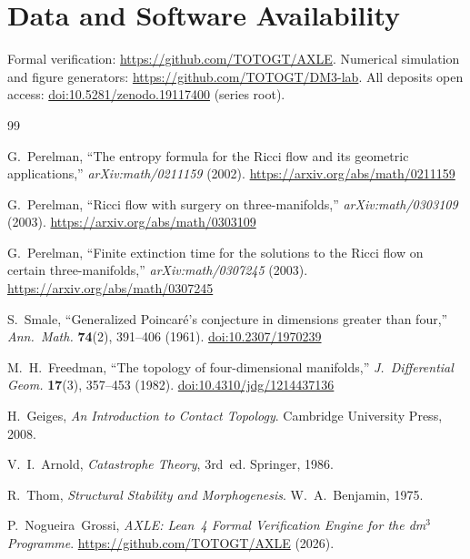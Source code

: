 \documentclass[12pt,a4paper]{article}
\begin{document}
\section*{Data and Software Availability}

Formal verification: \url{https://github.com/TOTOGT/AXLE}.
Numerical simulation and figure generators:
\url{https://github.com/TOTOGT/DM3-lab}.
All deposits open access:
\href{https://doi.org/10.5281/zenodo.19117400}%
{doi:10.5281/zenodo.19117400} (series root).

\begin{thebibliography}{99}
\sloppy

G.~Perelman,
``The entropy formula for the Ricci flow and its geometric applications,''
\textit{arXiv:math/0211159} (2002).
\url{https://arxiv.org/abs/math/0211159}

G.~Perelman,
``Ricci flow with surgery on three-manifolds,''
\textit{arXiv:math/0303109} (2003).
\url{https://arxiv.org/abs/math/0303109}

G.~Perelman,
``Finite extinction time for the solutions to the Ricci flow on
certain three-manifolds,''
\textit{arXiv:math/0307245} (2003).
\url{https://arxiv.org/abs/math/0307245}

S.~Smale,
``Generalized Poincar\'e's conjecture in dimensions greater than four,''
\textit{Ann.\ Math.} \textbf{74}(2), 391--406 (1961).
\href{https://doi.org/10.2307/1970239}{doi:10.2307/1970239}

M.~H.~Freedman,
``The topology of four-dimensional manifolds,''
\textit{J.\ Differential Geom.} \textbf{17}(3), 357--453 (1982).
\href{https://doi.org/10.4310/jdg/1214437136}{doi:10.4310/jdg/1214437136}

H.~Geiges,
\textit{An Introduction to Contact Topology}.
Cambridge University Press, 2008.

V.~I.~Arnold,
\textit{Catastrophe Theory}, 3rd~ed. Springer, 1986.

R.~Thom,
\textit{Structural Stability and Morphogenesis}.
W.~A.~Benjamin, 1975.

P.~Nogueira~Grossi,
\textit{AXLE: Lean~4 Formal Verification Engine for the dm$^3$ Programme}.
\url{https://github.com/TOTOGT/AXLE} (2026).


\end{thebibliography}
\end{document}
